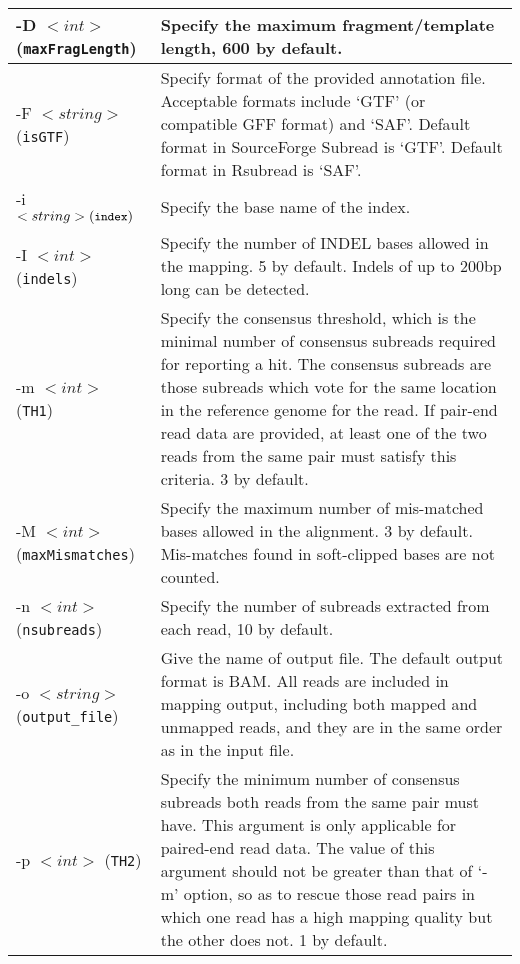 \documentclass[12pt]{report}
\newcommand{\code}[1]{{\small\texttt{#1}}}
\newcommand{\Subread}{\textsf{Subread}}
\newcommand{\Rsubread}{\textsf{Rsubread}}
\begin{document}
\begin{longtable}{|p{4cm}|p{12cm}|}
\hline
-D $<int>$ \newline (\code{maxFragLength}) & Specify the maximum fragment/template length, 600 by default.\\
\hline
-F $<string>$ \newline (\code{isGTF}) & Specify format of the provided annotation file. Acceptable formats include `GTF' (or compatible GFF format) and `SAF'. Default format in SourceForge {\Subread} is `GTF'. Default format in {\Rsubread} is `SAF'.   \\
\hline
-i $<string> \newline (\code{index}) $ & Specify the base name of the index.\\
\hline
-I $<int>$ \newline (\code{indels}) & Specify the number of INDEL bases allowed in the mapping. 5 by default. Indels of up to 200bp long can be detected.\\
\hline
-m  $<int>$ \newline (\code{TH1}) & Specify the consensus threshold, which is the minimal number of consensus subreads required for reporting a hit. The consensus subreads are those subreads which vote for the same location in the reference genome for the read. If pair-end read data are provided, at least one of the two reads from the same pair must satisfy this criteria. 3 by default.\\
\hline
-M $<int>$ \newline (\code{maxMismatches}) & Specify the maximum number of mis-matched bases allowed in the alignment. 3 by default. Mis-matches found in soft-clipped bases are not counted.\\
\hline
-n $<int>$ \newline (\code{nsubreads}) & Specify the number of subreads extracted from each read, 10 by default.\\
\hline
-o $<string>$ \newline (\code{output\_file}) & Give the name of output file. The default output format is BAM. All reads are included in mapping output, including both mapped and unmapped reads, and they are in the same order as in the input file.\\
\hline
-p $<int>$ \newline (\code{TH2}) & Specify the minimum number of consensus subreads both reads from the same pair must have. This argument is only applicable for paired-end read data. The value of this argument should not be greater than that of `-m' option, so as to rescue those read pairs in which one read has a high mapping quality but the other does not. 1 by default.\\

\end{longtable}
\end{document}

